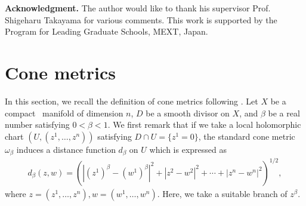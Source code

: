 \documentclass[12pt]{amsart}
\begin{document}
\vspace{10pt}

\noindent 
\textbf{Acknowledgment. }The author would like to thank his supervisor Prof. Shigeharu Takayama for various comments.
This work is supported by the Program for Leading Graduate Schools, MEXT, Japan.


\section{Cone metrics}

In this section, we recall the definition of cone metrics following \citep[Section 4]{Donaldson12KametricConesing}. Let $X$ be a compact \kahler \ manifold of dimension $n$, $D$ be a smooth divisor on $X$, and $\beta $ be a real number satisfying $0< \beta<1$. 
We first remark that if we take a local holomorphic chart $(U, (z^1, \dots, z^n))$ satisfying $D\cap U =\{ z^1 =0 \}$, 
the standard cone metric $\omega_\beta $ induces a distance function $d_\beta $ on $U$ which is expressed as 
\begin{align*}
	d_\beta (z,w) = \left( 
	\left|  (z^1)^\beta - (w^1)^\beta \right|^2
	+ | z^2 - w^2 |^2 + \cdots + | z^n - w^n |^2 
 \right)^{1/2},
\end{align*}
where $z=(z^1,\dots, z^n), w=(w^1, \dots, w^n)$. Here, we take a suitable branch of $z^\beta$.
\end{document}
